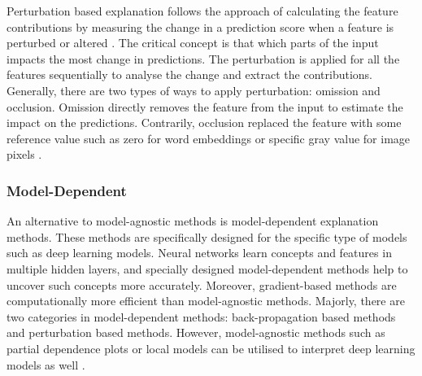 \documentclass[english]{tktltiki2}
\theoremstyle{definition}
\theoremstyle{remark}
\begin{document}
Perturbation based explanation follows the approach of calculating the feature contributions by measuring the change in a prediction score when a feature is perturbed or altered \citep{guidotti2018survey, molnarinterpretable, murdoch2019interpretable}. The critical concept is that which parts of the input impacts the most change in predictions. The perturbation is applied for all the features sequentially to analyse the change and extract the contributions. Generally, there are two types of ways to apply perturbation: omission and occlusion. Omission directly removes the feature from the input to estimate the impact on the predictions. Contrarily, occlusion replaced the feature with some reference value such as zero for word embeddings or specific gray value for image pixels \citep{ancona2017towards, murdoch2019interpretable}.

\subsubsection{Model-Dependent} %
An alternative to model-agnostic methods is model-dependent explanation methods. These methods are specifically designed for the specific type of models such as deep learning models. Neural networks learn concepts and features in multiple hidden layers, and specially designed model-dependent methods help to uncover such concepts more accurately. Moreover, gradient-based methods are computationally more efficient than model-agnostic methods. Majorly, there are two categories in model-dependent methods: back-propagation based methods and perturbation based methods. However, model-agnostic methods such as partial dependence plots or local models can be utilised to interpret deep learning models as well \citep{guidotti2018survey, molnarinterpretable, murdoch2019interpretable}.

\end{document}
